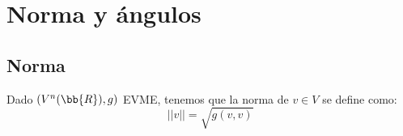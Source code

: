 \begin{comment}
\begin{prop}
    Sea considera el EVME $(V^n, g)$. Sean $\cc{B}, \cc{B}'$ dos bases de $V^n$ con matriz $P$ de cambio de base. Sea $A=M(g,\cc{B}), A'=M(g,\cc{B}')$. Sean $u,v\in V^n$. Supongamos $u\equiv x_\cc{B}\equiv x'_{\cc{B'}}$, $v \equiv y_\cc{B}\equiv y'_{\cc{B'}}$.
    
    Tenemos que:
    \begin{equation*}
        x^tAy = (x')^tA'y' \Longleftrightarrow P\in O(n) 
    \end{equation*}
\end{prop}
\begin{proof}
    Tenemos que:
    \begin{equation*}
        x=Px' \qquad y=Py'
    \end{equation*}

    Entonces:
    \begin{equation*}
        x^tAy = (x')^tA'y' \Longleftrightarrow
        (x')^t P^tAPy' = (x')^tA'y'
        \Longleftrightarrow P^tAP = A'
    \end{equation*}
\end{proof}
\end{comment}



\section{Norma y ángulos}
\subsection{Norma}
\begin{definicion} [Norma]
    Dado $(V^n(\bb{R}), g)$ EVME, tenemos que la norma de $v\in V$ se define como:
    \begin{equation*}
        ||v|| = \sqrt{g(v,v)}
    \end{equation*}
\end{definicion}

